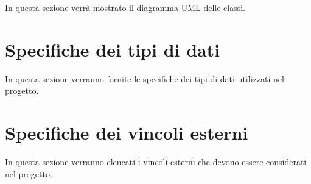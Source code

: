 \documentclass{article}
\begin{document}
In questa sezione verrà mostrato il diagramma UML delle classi.

\section{Specifiche dei tipi di dati}

In questa sezione verranno fornite le specifiche dei tipi di dati utilizzati nel progetto.

\section{Specifiche dei vincoli esterni}

In questa sezione verranno elencati i vincoli esterni che devono essere considerati nel progetto.
\end{document}
